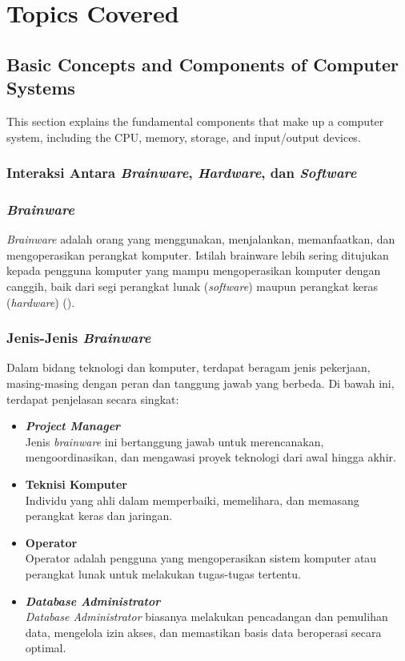 \documentclass[12pt]{article}
\begin{document}
\section{Topics Covered}

\subsection{Basic Concepts and Components of Computer Systems}
This section explains the fundamental components that make up a computer system, including the CPU, memory, storage, and input/output devices.

\subsubsection{Interaksi Antara \textit{Brainware}, \textit{Hardware}, dan \textit{Software}}

\subsubsection*{\textit{Brainware}}
\hspace{0.5cm} \textit{Brainware} adalah orang yang menggunakan, menjalankan, memanfaatkan, dan mengoperasikan perangkat komputer. Istilah brainware lebih sering ditujukan kepada pengguna komputer yang mampu mengoperasikan komputer dengan canggih, baik dari segi perangkat lunak (\textit{software}) maupun perangkat keras (\textit{hardware}) (\cite{brainwareKompas}).

\subsubsection*{Jenis-Jenis \textit{Brainware}}
\hspace{0.5cm} Dalam bidang teknologi dan komputer, terdapat beragam jenis pekerjaan, masing-masing dengan peran dan tanggung jawab yang berbeda. Di bawah ini, terdapat penjelasan secara singkat:
\begin{itemize}
    \item \textbf{\textit{Project Manager}}
    \\Jenis \textit{brainware} ini bertanggung jawab untuk merencanakan, mengoordinasikan, dan mengawasi proyek teknologi dari awal hingga akhir.
    \item \textbf{Teknisi Komputer}
    \\Individu yang ahli dalam memperbaiki, memelihara, dan memasang perangkat keras dan jaringan.
    \item \textbf{Operator}
    \\Operator adalah pengguna yang mengoperasikan sistem komputer atau perangkat lunak untuk melakukan tugas-tugas tertentu.
    \item \textbf{\textit{Database Administrator}}
    \\\textit{Database Administrator} biasanya melakukan pencadangan dan pemulihan data, mengelola izin akses, dan memastikan basis data beroperasi secara optimal.
\end{itemize}
\end{document}

